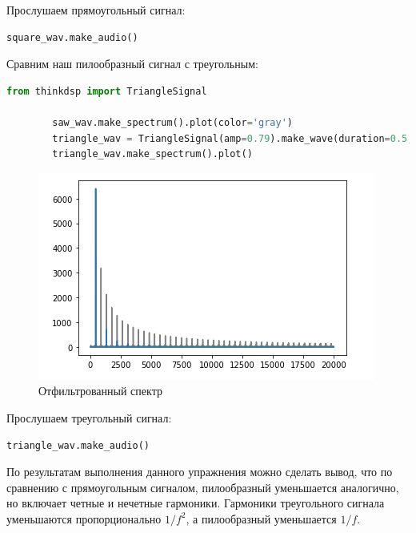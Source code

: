 \documentclass[a4paper, 14pt]{extarticle}
\begin{document}
    Прослушаем прямоугольный сигнал:

    \begin{lstlisting}[language=Python, caption= Создание звука прямоугольного сигнала, label={lst:square_make_audio}]
        square_wav.make_audio()
    \end{lstlisting}

    Сравним наш пилообразный сигнал с треугольным:

    \begin{lstlisting}[language=Python, caption= Фильтрация спектра, label={lst:triangle_sawtooth_spectr_plot}]
        from thinkdsp import TriangleSignal

        saw_wav.make_spectrum().plot(color='gray')
        triangle_wav = TriangleSignal(amp=0.79).make_wave(duration=0.5, framerate=40000)
        triangle_wav.make_spectrum().plot()
    \end{lstlisting}

    \begin{figure}[H]
        \centering
        \includegraphics[width=\textwidth]{triangle_sawtooth_spectr}
        \caption{Отфильтрованный спектр}
        \label{fig:triangle_sawtooth_spectr}
    \end{figure}

    Прослушаем треугольный сигнал:

    \begin{lstlisting}[language=Python, caption= Перевод в аудио, label={lst:triangle_make_audio}]
        triangle_wav.make_audio()
    \end{lstlisting}

    По результатам выполнения данного упражнения можно сделать вывод, что по сравнению с прямоугольным сигналом, пилообразный уменьшается аналогично, но включает четные и нечетные гармоники.
    Гармоники треугольного сигнала уменьшаются пропорционально \(1/f^2\), а пилообразный уменьшается \(1/f\).
\end{document}
